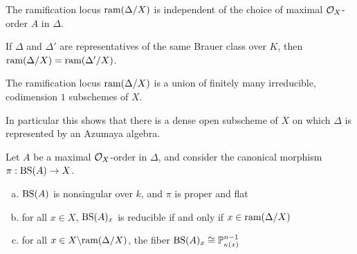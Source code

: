 \begin{lem}
The ramification locus $\textnormal{ram}(\Delta/X)$ is independent of the choice of maximal $\mathcal{O}_X$-order $A$ in $\Delta$.
\end{lem}

\begin{prop}
If $\Delta$ and $\Delta'$ are representatives of the same Brauer class over $K$, then $\textnormal{ram}(\Delta/X) = \textnormal{ram}(\Delta'/X)$.
\end{prop}

\begin{prop}
The ramification locus $\textnormal{ram}(\Delta/X)$ is a union of finitely many irreducible, codimension $1$ subschemes of $X$.
\end{prop}
In particular this shows that there is a dense open subscheme of $X$ on which $\Delta$ is represented by an Azumaya algebra.

\begin{prop}
Let $A$ be a maximal $\mathcal{O}_X$-order in $\Delta$, and consider the canonical morphism $\pi: \textnormal{BS}(A)\rightarrow X$.
\begin{enumerate}[(a)]
\item  $\textnormal{BS}(A)$ is nonsingular over $k$, and $\pi$ is proper and flat
\item  for all $x\in X$, $\textnormal{BS}(A)_x$ is reducible if and only if $x\in \textnormal{ram}(\Delta/X)$
\item  for all $x\in X\backslash \textnormal{ram}(\Delta/X)$, the fiber $\textnormal{BS}(A)_x \cong \mathbb{P}^{n-1}_{\kappa(x)}$
\end{enumerate}
\end{prop}

